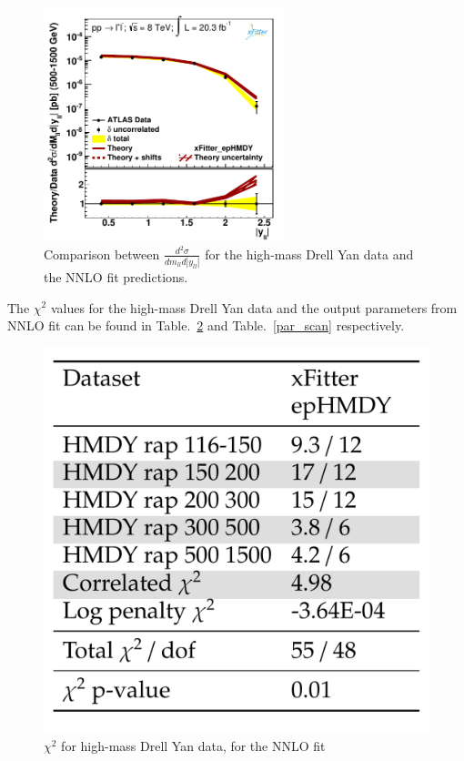 \begin{figure}
\includegraphics[width=7cm]{plots/data_5.pdf} 
\caption{Comparison between $\frac{d^{2}\sigma}{dm_{ll}d|y_{ll}|}$ for the high-mass Drell Yan data and the NNLO fit predictions.}
\label{hmDY_2D}
\end{figure}
The $\chi^{2}$ values for the high-mass Drell Yan data and the output parameters from NNLO fit can be found in Table.~\ref{chi2_scan} 
and Table.~\ref{par_scan} 
respectively. 
\begin{figure}
\includegraphics[width=14cm]{plots/chi2_hmDY.pdf} 
\caption{$\chi^{2}$ for high-mass Drell Yan data, for the NNLO fit}
\label{chi2_scan}
\end{figure}
